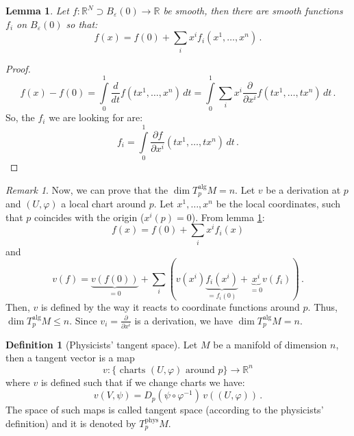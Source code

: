 \documentclass[a4paper,11pt,titlepage, article, oneside]{memoir}
\numberwithin{equation}{section}
\newtheorem{lemma}[theorem]{Lemma}
\theoremstyle{definition}
\newtheorem{definition}[theorem]{Definition}
\theoremstyle{remark}
\newtheorem{remark}[theorem]{Remark}
\newcommand{\rfield}{\mathbb{R}}
\newcommand{\diondi}[1]{\frac{d}{d{#1}}}
\newcommand{\deonde}[1]{\frac{\partial}{\partial {#1}}}
\newcommand{\defonde}[2]{\frac{\partial {#1}}{\partial {#2}}}
\newcommand{\tangentphys}[1]{T_{#1}^{\text{phys}}}
\newcommand{\tangentalg}[1]{T_{#1}^{\text{alg}}}
\begin{document}
\begin{lemma} \label{usefullemma}
Let $f \colon \rfield^N \supset B_{\varepsilon}(0) \rightarrow \rfield$ be smooth, then there are smooth functions $f_i$ on $B_{\varepsilon}(0)$ so that:
\begin{equation}
f(x) = f(0) + \sum\limits_i x^i f_i(x^1, \ldots, x^n) \, .
\end{equation}
\end{lemma}
\begin{proof}
\begin{equation*}
f(x)-f(0) = \int\limits_0^1 \diondi{t} f(tx^1, \ldots, x^n)\, dt = \int\limits_0^1 \sum_i x^i \deonde{x^i} f(tx^1, \ldots, tx^n) \, dt \, .
\end{equation*}
So, the $f_i$ we are looking for are:
\begin{equation*}
f_i = \int\limits_0^1 \defonde{f}{x^i}(tx^1, \ldots, tx^n)\, dt \, .
\end{equation*}
\end{proof}

\begin{remarkbox}\begin{remark}
Now, we can prove that the $\dim \tangentalg{p} M = n$. Let $v$ be a derivation at $p$ and $(U, \varphi)$ a local chart around $p$. Let $x^1, \ldots, x^n$ be the local coordinates, such that $p$ coincides with the origin ($x^i(p) = 0$). From lemma \ref{usefullemma}:
$$f(x) = f(0) + \sum\limits_i x^i f_i(x)$$
and
\[ v(f) = \underbrace{v(f(0))}_{=0} + \sum\limits_i \left( v(x^i) \underbrace{f_i(x^i)}_{=f_i(0)} + \underbrace{x^i}_{=0} v(f_i) \right) \, . \]
Then, $v$ is defined by the way it reacts to coordinate functions around $p$. Thus, $\dim \tangentalg{p} M \le n$. Since $v_i = \deonde{x^i}$ is a derivation, we have $\dim \tangentalg{p} M = n$.
\end{remark}\end{remarkbox}

\begin{definition}[Physicists' tangent space]
Let $M$ be a manifold of dimension $n$, then a tangent vector is a map
\begin{equation}
v \colon \{ \text{ charts } (U, \varphi) \text{ around } p \} \rightarrow \rfield^n
\end{equation}
where $v$ is defined such that if we change charts we have:
\begin{equation} \label{phystransf}
v(V, \psi) = D_p (\psi \circ \varphi^{-1})\, v((U, \varphi)) \, .
\end{equation}
The space of such maps is called tangent space (according to the physicists' definition) and it is denoted by $\tangentphys{p} M$.
\end{definition}
\end{document}
